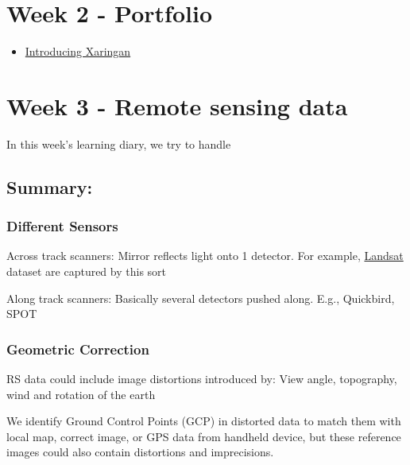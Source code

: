 \documentclass[
  letterpaper,
  DIV=11,
  numbers=noendperiod]{scrreprt}
\providecommand{\tightlist}{%
  \setlength{\itemsep}{0pt}\setlength{\parskip}{0pt}}\usepackage{longtable,booktabs,array}
\begin{document}

\hypertarget{week-2---portfolio}{%
\chapter{Week 2 - Portfolio}\label{week-2---portfolio}}

\begin{itemize}
\tightlist
\item
  \href{https://andrewmaclachlan.github.io/CASA0023/2_portfolio.html}{Introducing
  Xaringan}
\end{itemize}


\hypertarget{week-3---remote-sensing-data}{%
\chapter{Week 3 - Remote sensing
data}\label{week-3---remote-sensing-data}}

In this week's learning diary, we try to handle

\hypertarget{summary-1}{%
\section{Summary:}\label{summary-1}}

\hypertarget{different-sensors}{%
\subsection{Different Sensors}\label{different-sensors}}

Across track scanners: Mirror reflects light onto 1 detector. For
example, \uline{Landsat} dataset are captured by this sort

Along track scanners: Basically several detectors pushed along. E.g.,
Quickbird, SPOT

\hypertarget{geometric-correction}{%
\subsection{Geometric Correction}\label{geometric-correction}}

RS data could include image distortions introduced by: View angle,
topography, wind and rotation of the earth

We identify Ground Control Points (GCP) in distorted data to match them
with local map, correct image, or GPS data from handheld device, but
these reference images could also contain distortions and imprecisions.
\end{document}
